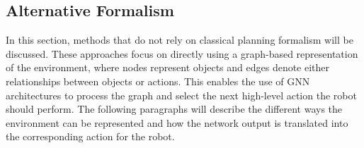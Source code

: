 \subsection{Alternative Formalism}
\label{sec:gnn_alternative_formalism}

In this section, methods that do not rely on classical planning formalism will be discussed. These approaches focus on directly using a graph-based representation of the environment, where nodes represent objects and edges denote either relationships between objects or actions. This enables the use of GNN architectures to process the graph and select the next high-level action the robot should perform. The following paragraphs will describe the different ways the environment can be represented and how the network output is translated into the corresponding action for the robot.
